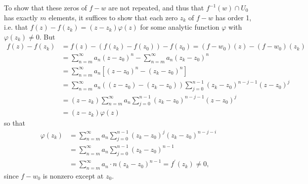 \documentclass{article}
\begin{document}
\begin{Answer}
To show that these
zeros of $f - w$ are not repeated, and thus that
$f^{-1}(w) \cap U_0$ has exactly $m$ elements, it suffices to show
that each zero $z_k$ of $f - w$ has order 1, i.e. that
$f(z) - f(z_k) = (z - z_k)\varphi(z)$ for some analytic function $\varphi$ with
$\varphi(z_k) \neq 0$. But
\begin{align*}
   f(z) - f(z_k)
&= f(z) - (f(z_k) - f(z_0)) - f(z_0)
 = (f - w_0)(z) - (f - w_0)(z_k) \\
&= \sum_{n=m}^\infty a_n (z - z_0)^n
 - \sum_{n=m}^\infty a_n (z_k - z_0)^n \\
&= \sum_{n=m}^\infty
     a_n
     \left[
       (z - z_0)^n - (z_k - z_0)^n
     \right] \\
&= \sum_{n=m}^\infty
      a_n
      ((z - z_0) - (z_k - z_0))
      \sum_{j=0}^{n-1}
        (z_k - z_0)^{n - j - 1}
        (z - z_0)^{j} \\
&= (z - z_k)
   \sum_{n=m}^\infty
     a_n
     \sum_{j=0}^{n-1}
       (z_k - z_0)^{n - j - 1}
       (z - z_0)^{j} \\
&= (z - z_k) \varphi(z)
\end{align*}
so that
\begin{align*}
   \varphi(z_k)
&= \sum_{n=m}^\infty
     a_n
     \sum_{j=0}^{n-1}
       (z_k - z_0)^j
       (z_k - z_0)^{n - j - i} \\
&= \sum_{n=m}^\infty
     a_n
     \sum_{j=0}^{n-1}
       (z_k - z_0)^{n-1} \\
&= \sum_{n=m}^\infty
     a_n \cdot n (z_k - z_0)^{n-1}
 = f^\prime(z_k) \neq 0,
\end{align*}
since $f - w_0$ is nonzero except at $z_0$.
\end{Answer}
\end{document}
